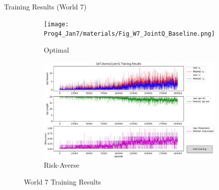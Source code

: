 \documentclass[aspectratio=1610, xcolor=dvipsnames]{packages/beamer}
\begin{document}
 \begin{frame}{Training Results (World 7)}
      \begin{figure}
      \centering
          \begin{subfigure}[b]{\Wfig\textwidth}  \centering
              \texttt{[image: Prog4\_Jan7/materials/Fig\_W7\_JointQ\_Baseline.png]}
              \caption{Optimal} \label{fig:W7baseline}
          \end{subfigure}
          \hfill
          \begin{subfigure}[b]{\Wfig\textwidth} \centering
              \includegraphics[width=\textwidth]{../results/IDQN_W7//Fig_W7_JointQ_Averse}
              \caption{Risk-Averse} \label{fig:W7averse}
          \end{subfigure}
     \caption{World 7 Training Results}
     \label{fig:W7}
     \end{figure}
 \end{frame}
\end{document}
